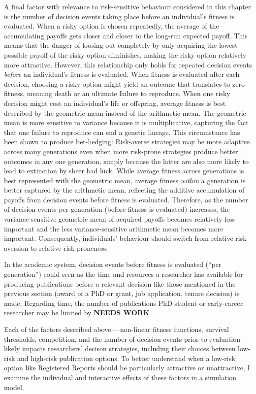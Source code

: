 \documentclass[british,,man,floatsintext]{apa6}
\begin{document}
A final factor with relevance to risk-sensitive behaviour considered in this chapter is the number of decision events taking place before an individual's fitness is evaluated.
When a risky option is chosen repeatedly, the average of the accumulating payoffs gets closer and closer to the long-run expected payoff.
This means that the danger of loosing out completely by only acquiring the lowest possible payoff of the risky option diminishes, making the risky option relatively more attractive.
However, this relationship only holds for repeated decision events \emph{before} an individual's fitness is evaluated.
When fitness is evaluated after each decision, choosing a risky option might yield an outcome that translates to zero fitness, meaning death or an ultimate failure to reproduce.
When one risky decision might cost an individual's life or offspring, average fitness is best described by the geometric mean instead of the arithmetic mean.
The geometric mean is more sensitive to variance because it is multiplicative, capturing the fact that one failure to reproduce can end a genetic lineage.
This circumstance has been shown to produce bet-hedging:
Risk-averse strategies may be more adaptive across many generations even when more risk-prone strategies produce better outcomes in any one generation, simply because the latter are also more likely to lead to extinction by sheer bad luck.
While average fitness across generations is best represented with the geometric mean, average fitness \emph{within} a generation is better captured by the arithmetic mean, reflecting the additive accumulation of payoffs from decision events before fitness is evaluated.
Therefore, as the number of decision events per generation (before fitness is evaluated) increases, the variance-sensitive geometric mean of acquired payoffs becomes relatively less important and the less variance-sensitive arithmetic mean becomes more important.
Consequently, individuals' behaviour should switch from relative risk aversion to relative risk-proneness.

In the academic system, decision events before fitness is evaluated (\enquote{per generation}) could seen as the time and resources a researcher has available for producing publications before a relevant decision like those mentioned in the previous section (award of a PhD or grant, job application, tenure decision) is made.
Regarding time, the number of publications PhD student or early-career researcher may be limited by
\textbf{NEEDS WORK}

Each of the factors described above\(\,\)---\(\,\)non-linear fitness functions, survival thresholds, competition, and the number of decision events prior to evaluation\(\,\)---\(\,\)likely impacts researchers' decison strategies, including their choices between low-risk and high-risk publication options.
To better understand when a low-risk option like Registered Reports should be particularly attractive or unattractive, I examine the individual and interactive effects of these factors in a simulation model.
\end{document}
